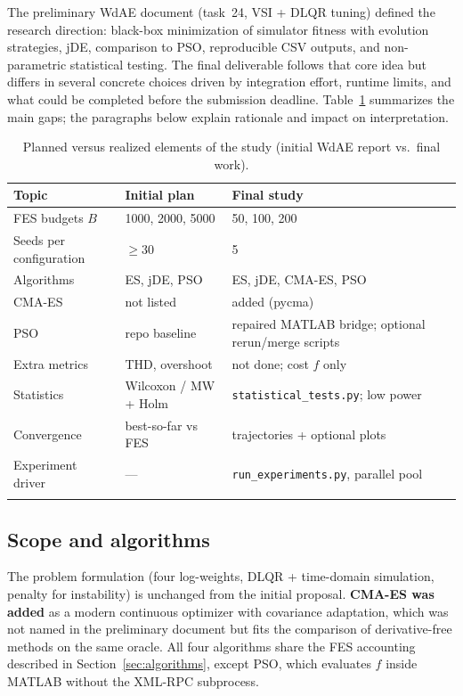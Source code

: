 \documentclass[pdflatex,sn-mathphys-num]{sn-jnl}
\begin{document}
The preliminary WdAE document (task~24, VSI + DLQR tuning) defined the research direction: black-box minimization of simulator fitness with evolution strategies, jDE, comparison to PSO, reproducible CSV outputs, and non-parametric statistical testing.
The final deliverable follows that core idea but differs in several concrete choices driven by integration effort, runtime limits, and what could be completed before the submission deadline.
Table~\ref{tab:deviations} summarizes the main gaps; the paragraphs below explain rationale and impact on interpretation.

\begin{table}[t]
\centering
\caption{Planned versus realized elements of the study (initial WdAE report vs.\ final work).}\label{tab:deviations}
\footnotesize
\setlength{\tabcolsep}{5pt}
\renewcommand{\arraystretch}{1.35}
\begin{tabular}{@{}p{} p{} p{}@{}}
\toprule
Topic & Initial plan & Final study \\
\midrule
FES budgets $B$ & 1000, 2000, 5000 & 50, 100, 200 \\
Seeds per configuration & $\ge 30$ & 5 \\
Algorithms & ES, jDE, PSO & ES, jDE, CMA-ES, PSO \\
CMA-ES & not listed & added (pycma) \\
PSO & repo baseline & repaired MATLAB bridge; optional rerun/merge scripts \\
Extra metrics & THD, overshoot & not done; cost $f$ only \\
Statistics & Wilcoxon / MW + Holm & \texttt{statistical\_tests.py}; low power \\
Convergence & best-so-far vs FES & trajectories + optional plots \\
Experiment driver & --- & \texttt{run\_experiments.py}, parallel pool \\
\botrule
\end{tabular}
\normalsize
\end{table}

\subsection{Scope and algorithms}

The problem formulation (four log-weights, DLQR + time-domain simulation, penalty for instability) is unchanged from the initial proposal.
\textbf{CMA-ES was added} as a modern continuous optimizer with covariance adaptation, which was not named in the preliminary document but fits the comparison of derivative-free methods on the same oracle.
All four algorithms share the FES accounting described in Section~\ref{sec:algorithms}, except PSO, which evaluates $f$ inside MATLAB without the XML-RPC subprocess.
\end{document}
